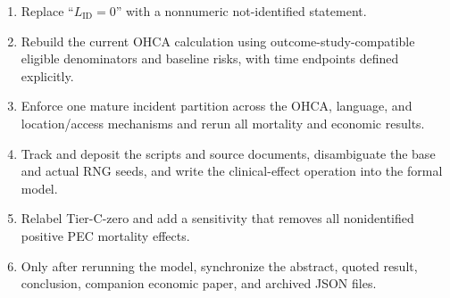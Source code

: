\documentclass[11pt]{article}
\begin{document}
\begin{enumerate}
\item Replace ``$L_{\mathrm{ID}}=0$'' with a nonnumeric not-identified statement.
\item Rebuild the current OHCA calculation using outcome-study-compatible
eligible denominators and baseline risks, with time endpoints defined
explicitly.
\item Enforce one mature incident partition across the OHCA, language, and
location/access mechanisms and rerun all mortality and economic results.
\item Track and deposit the scripts and source documents, disambiguate the base
and actual RNG seeds, and write the clinical-effect operation into the formal
model.
\item Relabel Tier-C-zero and add a sensitivity that removes all nonidentified
positive PEC mortality effects.
\item Only after rerunning the model, synchronize the abstract, quoted result,
conclusion, companion economic paper, and archived JSON files.
\end{enumerate}
\end{document}
